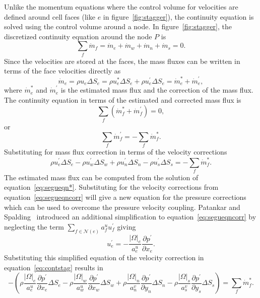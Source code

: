 Unlike the momentum equations where the control volume for velocities are defined around cell faces (like $e$ in figure~\ref{fig:stagger}), the continuity equation is solved using the control volume around a node. In figure~\ref{fig:stagger}, the discretized continuity equation around the node $P$ is
\begin{equation}
\sum_f \dot{m}_f = \dot{m}_e + \dot{m}_w + \dot{m}_n + \dot{m}_s = 0.
\end{equation}
Since the velocities are stored at the faces, the mass fluxes can be written in terms of the face velocities directly as
\begin{equation}
\dot{m}_e = \rho u_e \Delta S_e = \rho u_e^{\ast} \Delta S_e + \rho u_e^{\prime} \Delta S_e = \dot{m}_e^{\ast} + \dot{m}_e^{\prime},
\end{equation}
where $\dot{m}_e^{\ast}$ and $\dot{m}_e^{\prime}$ is the estimated mass flux and the correction of the mass flux. The continuity equation in terms of the estimated and corrected mass flux is
\begin{equation*}
\sum_f (\dot{m}_f^{\ast} + \dot{m}_f^{\prime}) = 0,
\end{equation*}
or
\begin{equation}
\sum_f \dot{m}_f^{\prime} = -\sum_f \dot{m}_f^{\ast}.
\end{equation} 
Substituting for mass flux correction in terms of the velocity corrections
\begin{equation}
\rho u^{\prime}_e \Delta S_e - \rho u^{\prime}_w \Delta S_w + \rho u^{\prime}_n \Delta S_n - \rho u^{\prime}_s \Delta S_s  = -\sum_f \dot{m}_f^{\ast}.
\label{eq:contstag}
\end{equation}
The estimated mass flux can be computed from the solution of equation~\ref{eq:segueqn*}. Substituting for the velocity corrections from equation~\ref{eq:segueqncorr} will give a new equation for the pressure corrections which can be used to overcome the pressure velocity coupling. Patankar and Spalding~\cite{Patankar1972} introduced an additional simplification to equation~\ref{eq:segueqncorr} by neglecting the term $\sum_{f \in\mathcal{N}(e)} a_f^u u_f^{\prime}$ giving 
\begin{equation}
u_e^{\prime} = -\frac{|\Omega|_e}{a_e^u} \frac{\partial p^{\prime}}{\partial x_e}.
\label{eq:simplestageqn}
\end{equation}
Substituting this simplified equation of the velocity correction in equation~\ref{eq:contstag} results in
\begin{equation}
-\left(\rho \frac{|\Omega|_e}{a_e^u} \frac{\partial p^{\prime}}{\partial x_e} \Delta S_e - \rho\frac{|\Omega|_w}{a_w^u} \frac{\partial p^{\prime}}{\partial x_w} \Delta S_w + \rho \frac{|\Omega|_n}{a_n^v} \frac{\partial p^{\prime}}{\partial y_n} \Delta S_n - \rho \frac{|\Omega|_s}{a_s^v} \frac{\partial p^{\prime}}{\partial y_s} \Delta S_s\right)  = \sum_f \dot{m}_f^{\ast}.
\label{eq:pcorrstag1}
\end{equation}
